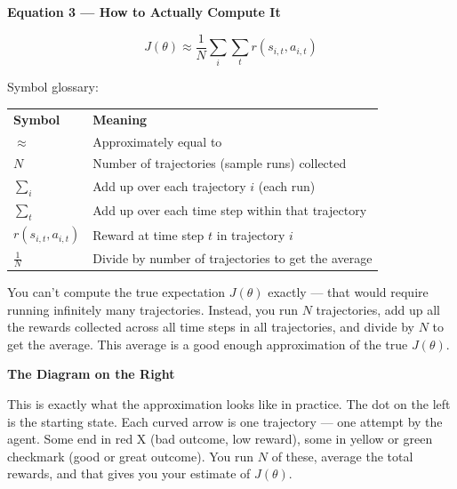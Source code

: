 \textbf{Equation 3 --- How to Actually Compute It}

\[
J(\theta) \approx \frac{1}{N} \sum_i \sum_t r(s_{i,t}, a_{i,t})
\]

Symbol glossary:

\begin{tabular}{ll}
\textbf{Symbol} & \textbf{Meaning} \\[4pt]
$\approx$ & Approximately equal to \\
$N$ & Number of trajectories (sample runs) collected \\
$\sum_i$ & Add up over each trajectory $i$ (each run) \\
$\sum_t$ & Add up over each time step within that trajectory \\
$r(s_{i,t}, a_{i,t})$ & Reward at time step $t$ in trajectory $i$ \\
$\frac{1}{N}$ & Divide by number of trajectories to get the average \\
\end{tabular}

\medskip

You can't compute the true expectation $J(\theta)$ exactly --- that would require running infinitely many trajectories. Instead, you run $N$ trajectories, add up all the rewards collected across all time steps in all trajectories, and divide by $N$ to get the average. This average is a good enough approximation of the true $J(\theta)$.

\textbf{The Diagram on the Right}

This is exactly what the approximation looks like in practice. The dot on the left is the starting state. Each curved arrow is one trajectory --- one attempt by the agent. Some end in red X (bad outcome, low reward), some in yellow or green checkmark (good or great outcome). You run $N$ of these, average the total rewards, and that gives you your estimate of $J(\theta)$.